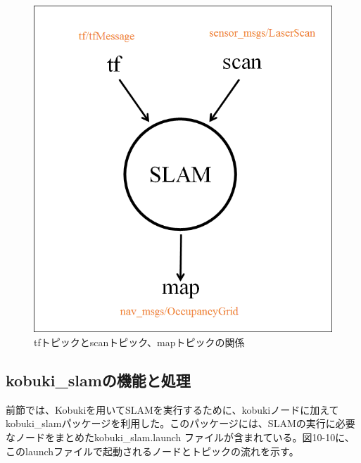 \begin{figure}[ht]
  \centering
  \includegraphics[width=\columnwidth]{pictures/chapter10/pic_10_09.png}
  \caption{tfトピックとscanトピック、mapトピックの関係}
\end{figure}

\subsection{kobuki\_slamの機能と処理}

前節では、Kobukiを用いてSLAMを実行するために、kobukiノードに加えてkobuki\_slamパッケージを利用した。このパッケージには、SLAMの実行に必要なノードをまとめたkobuki\_slam.launch ファイルが含まれている。図10-10に、このlaunchファイルで起動されるノードとトピックの流れを示す。

